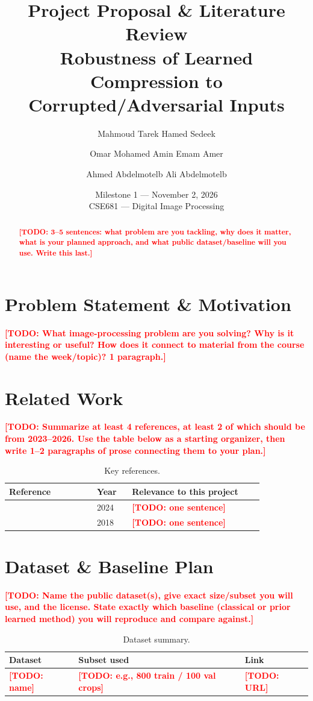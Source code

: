 \documentclass[11pt]{article}
\title{\LARGE Project Proposal \& Literature Review \\[4pt]
\large {Robustness of Learned Compression to Corrupted/Adversarial Inputs}}
\author{
  {Mahmoud Tarek Hamed Sedeek} \and
  {Omar Mohamed Amin Emam Amer} \and
  {Ahmed Abdelmotelb Ali Abdelmotelb}
}
\date{Milestone 1 --- {November 2, 2026} \\{} CSE681 --- Digital Image Processing}
\newcommand{\todo}[1]{\textcolor{red}{\textbf{[TODO: #1]}}}
\begin{document}
\maketitle

\begin{abstract}
\todo{3--5 sentences: what problem are you tackling, why does it matter, what is your
planned approach, and what public dataset/baseline will you use. Write this last.}
\end{abstract}

\section{Problem Statement \& Motivation}
\label{sec:motivation}
\todo{What image-processing problem are you solving? Why is it interesting or useful?
How does it connect to material from the course (name the week/topic)? 1 paragraph.}

\section{Related Work}
\label{sec:related}
\todo{Summarize at least 4 references, at least 2 of which should be from 2023--2026.
Use the table below as a starting organizer, then write 1--2 paragraphs of prose
connecting them to your plan.}

\begin{table}[h]
\centering
\caption{Key references.}
\label{tab:refs}
\begin{tabular}{@{}p{0.30\linewidth}p{0.12\linewidth}p{0.45\linewidth}@{}}
\toprule
\textbf{Reference} & \textbf{Year} & \textbf{Relevance to this project} \\
\midrule
\citep{example2024} & 2024 & \todo{one sentence} \\
\citep{example2018}  & 2018 & \todo{one sentence} \\
\bottomrule
\end{tabular}
\end{table}

\section{Dataset \& Baseline Plan}
\label{sec:data}
\todo{Name the public dataset(s), give exact size/subset you will use, and the license.
State exactly which baseline (classical or prior learned method) you will reproduce
and compare against.}

\begin{table}[h]
\centering
\caption{Dataset summary.}
\label{tab:data}
\begin{tabular}{@{}lll@{}}
\toprule
\textbf{Dataset} & \textbf{Subset used} & \textbf{Link} \\
\midrule
\todo{name} & \todo{e.g., 800 train / 100 val crops} & \todo{URL} \\
\bottomrule
\end{tabular}
\end{table}
\end{document}
